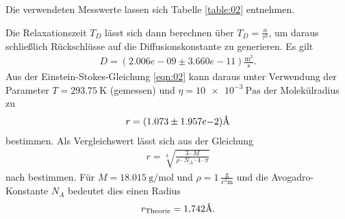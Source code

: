 \FloatBarrier
\noindent Die verwendeten Messwerte lassen sich Tabelle \ref{table:02} entnehmen.
\FloatBarrier

\FloatBarrier
\noindent Die Relaxationszeit $T_D$ lässt sich dann berechnen über
$T_D = \frac{a}{\tau^3}$, um daraus schließlich Rückschlüsse auf die
Diffusionskonstante zu generieren. Es gilt
\begin{align*}
  D = (2.006e-09 \pm 3.660e-11) \frac{\si{\meter^2}}{\si{\second}}.
\end{align*}
\noindent Aus der Einstein-Stokes-Gleichung \ref{eqn:02} kann daraus unter Verwendung der
Parameter $T = \SI{293.75}{\kelvin}$ (gemessen) und $\eta = \SI{10e-3}{\pascal\second}$
\cite{Viskosität_Wasser} der Molekülradius zu
\begin{align*}
 r = (1.073\pm 1.957e{-2}) \text{\r{A}}
\end{align*}
\noindent bestimmen. Als Vergleichswert lässt sich aus der Gleichung
\begin{align}
  r = \sqrt[3]{\frac{3 \cdot M}{\rho \cdot N_A \cdot 4 \cdot \pi}}
  \label{eqn:07}
\end{align}
\noindent nach \cite{radius} bestimmen. Für $M = \SI{18.015}{\gram\per\mol}$
und $\rho = 1 \: \frac{\si{\gram}}{\si{\cubic\centi\meter}}$
\cite{Viskosität_Wasser} und die Avogadro-Konstante $N_A$ bedeutet dies einen
Radius
\begin{align*}
  r_\text{Theorie} = \num{1.742} \text{\r{A}}.
\end{align*}
